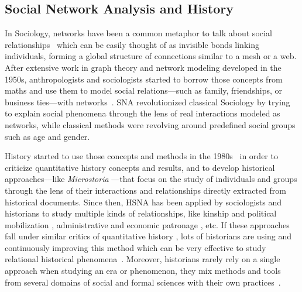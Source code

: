 \subsection{Social Network Analysis and History}

In Sociology, networks have been a common metaphor to talk about social relationships~\cite{freeman_development_2004} which can be easily thought of as invisible bonds linking individuals, forming a global structure of connections similar to a mesh or a web. After extensive work in graph theory and network modeling developed in the 1950s, anthropologists and sociologists started to borrow those concepts from maths and use them to model social relations---such as family, friendships, or business ties---with networks~\cite{coleman_introduction_1964, freeman_development_2004}. SNA revolutionized classical Sociology by trying to explain social phenomena through the lens of real interactions modeled as networks, while classical methods were revolving around predefined social groups such as age and gender.

History started to use those concepts and methods in the 1980s~\cite{wetherell_historical_1998} in order to criticize quantitative history concepts and results,
and to develop historical approaches---like \textit{Microstoria} \cite{ginzburgMicrohistoire1981}---that focus on the study of individuals and groups through the lens of their interactions and relationships directly extracted from historical documents.
Since then, HSNA has been applied by sociologists and historians to study multiple kinds of relationships, like kinship and political mobilization \cite{lippKinshipNetworksLocal2005}, administrative and economic patronage \cite{moutoukiasReseauxPersonnelsAutorite1992},
etc. If these approaches fall under similar critics of quantitative history \cite{lemercier12FormalNetwork2015}, lots of historians are using and continuously improving this method which can be very effective to study relational historical phenomena~\cite{kerschbaumerPowerNetworksProspects2015}.
Moreover, historians rarely rely on a single approach when studying an era or phenomenon, they mix methods and tools from several domains of social and formal sciences with their own practices~\cite{padgettRobustActionRise1993, petzCombiningNetworkResearch2022}.

